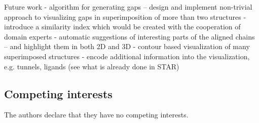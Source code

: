 \documentclass[twocolumn]{bmcart}%
\begin{document}
Future work
- algorithm for generating gaps -- design and implement non-trivial approach to visualizing gaps in superimposition of more than two structures
- introduce a similarity index which would be created with the cooperation of domain experts
- automatic suggestions of interesting parts of the aligned chains -- and highlight them in both 2D and 3D
- contour based visualization of many superimposed structures
- encode additional information into the visualization, e.g. tunnels, ligands (see what is already done in STAR)

\begin{backmatter}


\section*{Competing interests}
The authors declare that they have no competing interests.





\end{backmatter}
\end{document}
